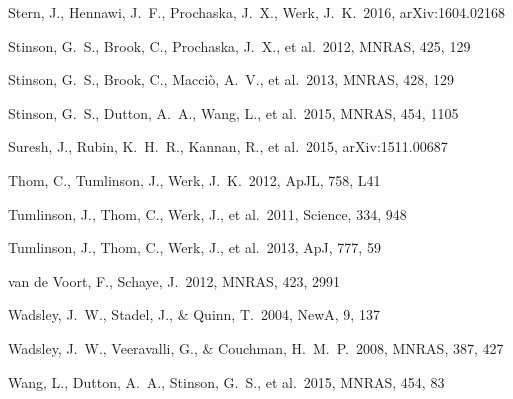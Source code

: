 \documentclass[useAMS,usenatbib]{mn2e}
\def \apj {ApJ}
\def \apjl {ApJL}
\def \mnras {MNRAS}
\def \na {NewA}
\begin{document}
\begin{thebibliography}{}
Stern, J., Hennawi, J.~F., Prochaska, J.~X., Werk, J.~K.\ 2016, arXiv:1604.02168

%
 Stinson, G.~S., Brook, C., Prochaska, J.~X., et al.\ 2012, \mnras, 425, 129

 Stinson, G.~S., Brook, 
C., Macci{\`o}, A.~V., et al.\ 2013, \mnras, 428, 129 

 Stinson, G.~S., Dutton, A.~A., Wang, L., et al.\ 2015, \mnras, 454, 1105 

%
 Suresh, J., Rubin, K.~H.~R., Kannan, R., et al.\ 2015, arXiv:1511.00687


Thom, C., Tumlinson, J., Werk, J.~K.\ 2012, \apjl, 758, L41

 Tumlinson, J., Thom, C., Werk, J., et al.\ 2011, Science, 334, 948

 Tumlinson, J., Thom, C., Werk, J., et al.\ 2013, \apj, 777, 59


 van de Voort, F., Schaye, J.\ 2012, \mnras, 423, 2991



 Wadsley, J.~W., Stadel, 
J., \& Quinn, T.\ 2004, \na, 9, 137 

 Wadsley, J.~W., 
Veeravalli, G., \& Couchman, H.~M.~P.\ 2008, \mnras, 387, 427 

 Wang, L., Dutton, A.~A.,  Stinson, G.~S., et al.\ 2015, \mnras, 454, 83
  

\end{thebibliography}
\end{document}
